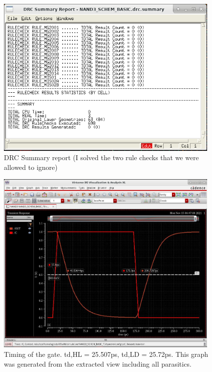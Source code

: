 \documentclass[11pt]{article}
\begin{document}
\begin{figure}[H]
  \includegraphics[width=0.98\textwidth]{drc.png}
  \caption{DRC Summary report (I solved the two rule checks that we were allowed to ignore)}
\end{figure}

\begin{figure}[H]
  \includegraphics[width=0.98\textwidth]{timing.png}
  \caption{Timing of the gate. td,HL = 25.507ps, td,LD = 25.72ps. This graph was generated from the extracted view including all parasitics.}
\end{figure}
\end{document}
